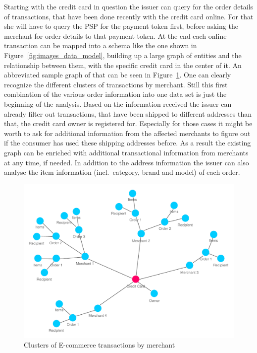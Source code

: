 Starting with the credit card in question the issuer can query for the order details of transactions, that have been done recently with the credit card online. For that she will have to query the \gls{PSP} for the payment token first, before asking the merchant for order details to that payment token. At the end each online transaction can be mapped into a schema like the one shown in Figure~\ref{fig:images_data_model}, building up a large graph of entities and  the relationship between them, with the specific credit card in the center of it. An abbreviated sample graph of that can be seen in Figure~\ref{fig:images_credit_card_graph}. One can clearly recognize the different clusters of transactions by merchant. Still this first combination of the various order information into one data set is just the beginning of the analysis. Based on the information received the issuer can already filter out transactions, that have been shipped to different addresses than that, the credit card owner is registered for. Especially for those cases it might be worth to ask for additional information from the affected merchants to figure out if the consumer has used these shipping addresses before. As a result the existing graph can be enriched with additional transactional information from merchants at any time, if needed. In addition to the address information the issuer can also analyse the item information (incl.\ category, brand and model) of each order. \\

\begin{figure}[!ht]
  \centering
  \includegraphics[width=0.9\columnwidth]{images/ontology_scenario_2.pdf}
  \caption{Clusters of E-commerce transactions by merchant}
\label{fig:images_credit_card_graph}
\end{figure}

